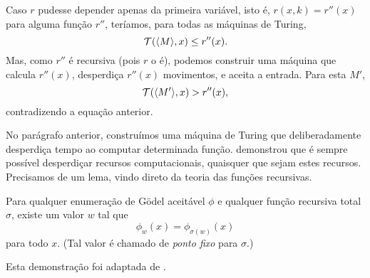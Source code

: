 Caso $r$ pudesse depender apenas da primeira variável,
isto é, $r(x, k) = r''(x)$ para alguma função $r''$,
teríamos, para todas as máquinas de Turing,
\begin{equation*}
    {\mathcal{T}}(\langle M \rangle, x) \leq r''(x).
\end{equation*}
Mas, como $r''$ é recursiva
(pois $r$ o é),
podemos construir uma máquina que calcula $r''(x)$,
desperdiça $r''(x)$ movimentos,
e aceita a entrada.
Para esta $M'$,
\begin{equation*}
    {\mathcal{T}}(\langle M' \rangle, x) > r''(x),
\end{equation*}
contradizendo a equação anterior.

No parágrafo anterior,
construímos uma máquina de Turing
que deliberadamente desperdiça tempo
ao computar determinada função.
 demonstrou que
é sempre possível desperdiçar recursos computacionais,
quaisquer que sejam estes recursos.
Precisamos de um lema,
vindo direto da teoria das funções recursivas.

\begin{lemma}
    Para qualquer enumeração de Gödel aceitável $\phi$
    e qualquer função recursiva total $\sigma$,
    existe um valor $w$ tal que
    \begin{equation*}
        \phi_w(x) = \phi_{\sigma(w)}(x)
    \end{equation*}
    para todo $x$.
    (Tal valor é chamado de \emph{ponto fixo} para $\sigma$.)
    \label{thm:recursion}
\end{lemma}

Esta demonstração foi adaptada de \cite[p.~208]{HopcroftUllman1979}.

